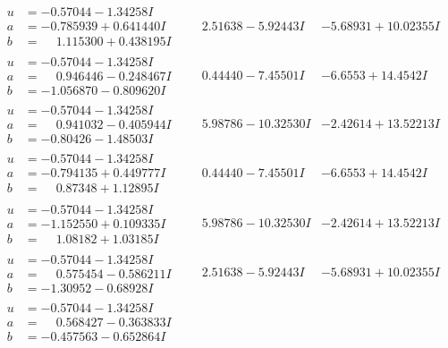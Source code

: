 \documentclass[1p]{elsarticle_modified}
\theoremstyle{definition}
\begin{document}
$$\begin{array}{c|c|c}
 \hline 
\begin{aligned}
u &= -0.57044 - 1.34258 I \\
a &= -0.785939 + 0.641440 I \\
b &= \phantom{-}1.115300 + 0.438195 I\end{aligned}
 & \phantom{-}2.51638 - 5.92443 I & -5.68931 + 10.02355 I \\ \hline\begin{aligned}
u &= -0.57044 - 1.34258 I \\
a &= \phantom{-}0.946446 - 0.248467 I \\
b &= -1.056870 - 0.809620 I\end{aligned}
 & \phantom{-}0.44440 - 7.45501 I & -6.6553 + 14.4542 I \\ \hline\begin{aligned}
u &= -0.57044 - 1.34258 I \\
a &= \phantom{-}0.941032 - 0.405944 I \\
b &= -0.80426 - 1.48503 I\end{aligned}
 & \phantom{-}5.98786 - 10.32530 I & -2.42614 + 13.52213 I \\ \hline\begin{aligned}
u &= -0.57044 - 1.34258 I \\
a &= -0.794135 + 0.449777 I \\
b &= \phantom{-}0.87348 + 1.12895 I\end{aligned}
 & \phantom{-}0.44440 - 7.45501 I & -6.6553 + 14.4542 I \\ \hline\begin{aligned}
u &= -0.57044 - 1.34258 I \\
a &= -1.152550 + 0.109335 I \\
b &= \phantom{-}1.08182 + 1.03185 I\end{aligned}
 & \phantom{-}5.98786 - 10.32530 I & -2.42614 + 13.52213 I \\ \hline\begin{aligned}
u &= -0.57044 - 1.34258 I \\
a &= \phantom{-}0.575454 - 0.586211 I \\
b &= -1.30952 - 0.68928 I\end{aligned}
 & \phantom{-}2.51638 - 5.92443 I & -5.68931 + 10.02355 I \\ \hline\begin{aligned}
u &= -0.57044 - 1.34258 I \\
a &= \phantom{-}0.568427 - 0.363833 I \\
b &= -0.457563 - 0.652864 I\end{aligned}

\end{array}$$
\end{document}
